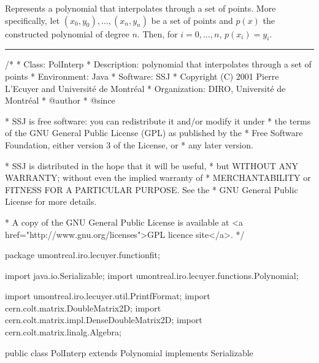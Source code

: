
Represents a polynomial that interpolates through a set of points. More
specifically, let $(x_0,y_0), \ldots, (x_n, y_n)$ be a set of points and
$p(x)$ the constructed polynomial of degree $n$. Then, for $i=0,\ldots,n$,
$p(x_i)=y_i$.

\bigskip\hrule

\begin{code}
\begin{hide}
/*
 * Class:        PolInterp
 * Description:  polynomial that interpolates through a set of points
 * Environment:  Java
 * Software:     SSJ 
 * Copyright (C) 2001  Pierre L'Ecuyer and Université de Montréal
 * Organization: DIRO, Université de Montréal
 * @author       
 * @since

 * SSJ is free software: you can redistribute it and/or modify it under
 * the terms of the GNU General Public License (GPL) as published by the
 * Free Software Foundation, either version 3 of the License, or
 * any later version.

 * SSJ is distributed in the hope that it will be useful,
 * but WITHOUT ANY WARRANTY; without even the implied warranty of
 * MERCHANTABILITY or FITNESS FOR A PARTICULAR PURPOSE.  See the
 * GNU General Public License for more details.

 * A copy of the GNU General Public License is available at
   <a href="http://www.gnu.org/licenses">GPL licence site</a>.
 */
\end{hide}
package umontreal.iro.lecuyer.functionfit;\begin{hide}

import java.io.Serializable;
import umontreal.iro.lecuyer.functions.Polynomial;

import umontreal.iro.lecuyer.util.PrintfFormat;
import cern.colt.matrix.DoubleMatrix2D;
import cern.colt.matrix.impl.DenseDoubleMatrix2D;
import cern.colt.matrix.linalg.Algebra;
\end{hide}

public class PolInterp extends Polynomial implements Serializable\begin{hide} {
   private static final long serialVersionUID = -710451931485296501L;
   private static final Algebra alg = new Algebra ();
   private double[] x;
   private double[] y;
\end{hide}
\end{code}

